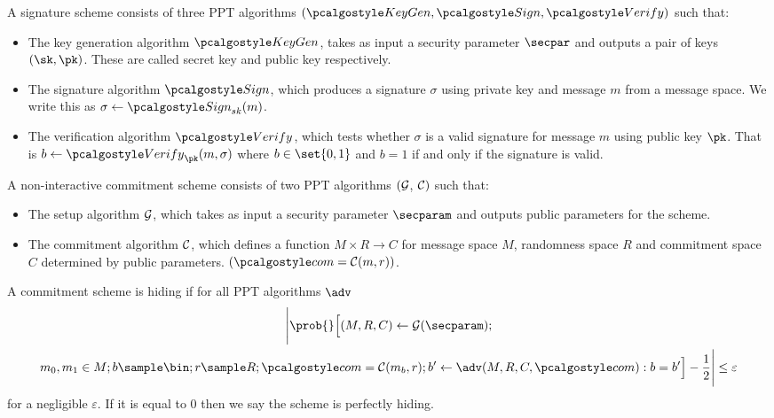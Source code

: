 \begin{definition}
A signature scheme consists of three \textsc{PPT} algorithms $(\kgen, \sig, \verify)$ such that:
\begin{itemize}
    \item The key generation algorithm $\kgen$, takes as input a security parameter $\secpar$ and outputs a pair of keys $(\sk, \pk)$. These are called secret key and public key respectively.
    \item The signature algorithm $\sig$, which produces a signature $\sigma$ using private key and message $m$ from a message space. We write this as $\sigma \gets \sig_{sk}(m)$.
    \item The verification algorithm $\verify$, which tests whether $\sigma$ is a valid signature for message $m$ using public key $\pk$. That is $b \gets \verify_\pk(m, \sigma)$ where $b \in \set{0, 1}$ and $b = 1$ if and only if the signature is valid.
\end{itemize}
\end{definition}


\begin{definition}
A non-interactive commitment scheme consists of two \textsc{PPT} algorithms $(\mathcal{G}$, $\mathcal{C})$ such that:
\begin{itemize}
    \item The setup algorithm $\mathcal{G}$, which takes as input a security parameter $\secparam$ and outputs public parameters for the scheme.
    \item The commitment algorithm $\mathcal{C}$, which defines a function $M \times R \rightarrow C$ for message space $M$, randomness space $R$ and commitment space $C$ determined by public parameters. $(\com = \commit(m, r))$.
\end{itemize}
\end{definition}

\begin{definition}
A commitment scheme is hiding if for all \textsc{PPT} algorithms $\adv$
\begin{multline*}
  \Bigg| \prob{} \Big[ (M, R, C) \gets \setup(\secparam); \\ m_0, m_1 \in M; b \sample \bin; r \sample R; \com = \commit(m_b, r);
  b' \gets \adv(M, R, C, \com): b = b' \Big] - \frac{1}{2} \Bigg| \leq \varepsilon
\end{multline*}
for a negligible $\varepsilon$. If it is equal to $0$ then we say the scheme is perfectly hiding.
\end{definition}

